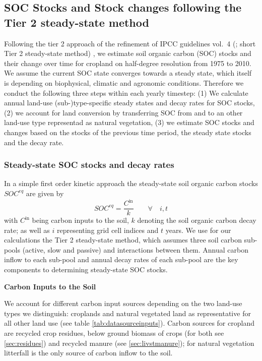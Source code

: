 \documentclass[gc, manuscript]{copernicus}
\begin{document}
\hypertarget{sec:carbonbudget}{%
\subsection{SOC Stocks and Stock changes following the Tier 2 steady-state method}\label{sec:carbonbudget}}

Following the tier 2 approach of the refinement of IPCC guidelines vol.~4 (\citet{ipcc_2019_2019}; short Tier 2 steady-state method) , we estimate soil organic carbon (SOC) stocks and their change over time for cropland on half-degree resolution from 1975 to 2010. We assume the current SOC state converges towards a steady state, which itself is depending on biophysical, climatic and agronomic conditions. Therefore we conduct the following three steps within each yearly timestep:
(1) We calculate annual land-use (sub-)type-specific steady states and decay rates for SOC stocks,
(2) we account for land conversion by transferring SOC from and to an other land-use type representad as natural vegetation,
(3) we estimate SOC stocks and changes based on the stocks of the previous time period, the steady state stocks and the decay rate.

\hypertarget{steady-state-soc-stocks-and-decay-rates}{%
\subsubsection{Steady-state SOC stocks and decay rates}\label{steady-state-soc-stocks-and-decay-rates}}

In a simple first order kinetic approach the steady-state soil organic carbon stocks \(SOC^{eq}\) are given by
\begin{equation}
SOC^{eq} =\frac{C^{\textrm{in}}}{k} \qquad\forall\quad i,t
\label{eq:inoutflow}
\end{equation}
with \(C^{\textrm{in}}\) being carbon inputs to the soil, \(k\) denoting the soil organic carbon decay rate; as well as \(i\) representing grid cell indices and \(t\) years. We use for our calculations the Tier 2 steady-state method, which assumes three soil carbon sub-pools (active, slow and passive) and interactions between them. Annual carbon inflow to each sub-pool and annual decay rates of each sub-pool are the key components to determining steady-state SOC stocks.

\textbf{Carbon Inputs to the Soil}

We account for different carbon input sources depending on the two land-use types we distinguish: croplands and natural vegetated land as representative for all other land use (see table \ref{tab:datasourceinputs}). Carbon sources for cropland are recycled crop residues, below ground biomass of crops (for both see \ref{sec:residues}) and recycled manure (see \ref{sec:livstmanure}); for natural vegetation litterfall \citep{schaphoff_lpjml4_2018} is the only source of carbon inflow to the soil.
\end{document}
